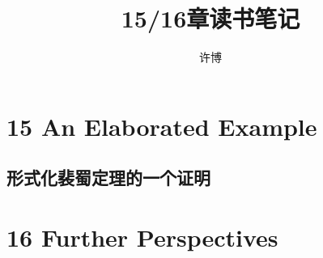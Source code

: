 \documentclass[UTF8]{article}
\title{15/16章读书笔记}
\author{许博}
\date{}
\begin{document}
\maketitle

\newpage
\section{15 An Elaborated Example}
	\subsection{形式化裴蜀定理的一个证明}
	
\newpage
\section{16 Further Perspectives}
\end{document}
